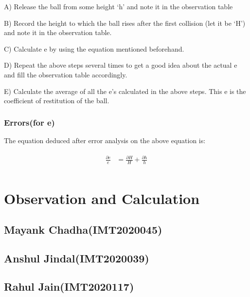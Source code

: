 \documentclass[11pt]{scrartcl} %
\begin{document}
A) Release the ball from some height ‘h’ and note it in the observation table \par

B) Record the height to which the ball rises after the first collision (let it be ‘H’) and note it in the observation table. \par

C) Calculate e by using the equation mentioned beforehand. \par

D) Repeat the above steps several times to get a good idea about the actual e and fill the observation table accordingly. \par

E) Calculate the average of all the e’s calculated in the above steps. This e is the coefficient of restitution of the ball. \par

\subsubsection{Errors(for e)}
The equation deduced after error analysis on the above equation is:\par

\begin{align} 
	\begin{split}
		\frac{\partial{e}}{e} &= \frac{\partial{H}}{H} + \frac{\partial{h}}{h}\\
	\end{split}					
\end{align}


\section{Observation and Calculation}
\subsection{Mayank Chadha(IMT2020045)}
\subsection{Anshul Jindal(IMT2020039)}
\subsection{Rahul Jain(IMT2020117)}
\end{document}
